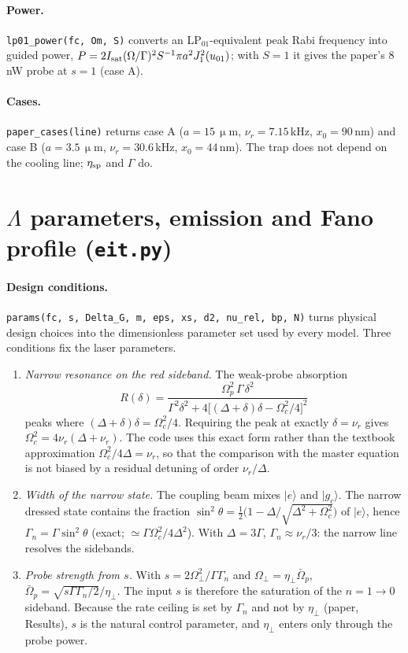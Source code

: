 \documentclass[11pt,a4paper]{article}
\newcommand{\ket}[1]{|#1\rangle}
\newcommand{\gc}{\ket{g_c}}
\newcommand{\Om}{\Omega}
\newcommand{\etap}{\eta_\perp}
\newcommand{\code}[1]{\texttt{#1}}
\newcommand{\um}{\,\upmu\mathrm{m}}
\begin{document}
\paragraph{Power.} \code{lp01\_power(fc, Om, S)} converts an LP$_{01}$-equivalent peak Rabi frequency into guided power, $P=2I_{\rm sat}(\Om/\Gamma)^2S^{-1}\pi a^2J_1^2(u_{01})$; with $S=1$ it gives the paper's 8\,nW probe at $s=1$ (case A).

\paragraph{Cases.} \code{paper\_cases(line)} returns case A ($a=15\um$, $\nu_r=7.15$\,kHz, $x_0=90$\,nm) and case B ($a=3.5\um$, $\nu_r=30.6$\,kHz, $x_0=44$\,nm). The trap does not depend on the cooling line; $\eta_{\rm sp}$ and $\Gamma$ do.

\section{$\Lambda$ parameters, emission and Fano profile (\code{eit.py})}
\label{sec:params}
\paragraph{Design conditions.} \code{params(fc, s, Delta\_G, m, eps, xs, d2, nu\_rel, bp, N)} turns physical design choices into the dimensionless parameter set used by every model. Three conditions fix the laser parameters.
\begin{enumerate}
\item \emph{Narrow resonance on the red sideband.} The weak-probe absorption~\cite{morigi2000,fleischhauer2005}
\begin{equation}
  R(\delta)=\frac{\Om_p^2\,\Gamma\,\delta^2}{\Gamma^2\delta^2+4\big[(\Delta+\delta)\delta-\Om_c^2/4\big]^2}
  \label{eq:fano}
\end{equation}
peaks where $(\Delta+\delta)\delta=\Om_c^2/4$. Requiring the peak at exactly $\delta=\nu_r$ gives $\Om_c^2=4\nu_r(\Delta+\nu_r)$. The code uses this exact form rather than the textbook approximation $\Om_c^2/4\Delta=\nu_r$, so that the comparison with the master equation is not biased by a residual detuning of order $\nu_r/\Delta$.
\item \emph{Width of the narrow state.} The coupling beam mixes $\ket e$ and $\gc$. The narrow dressed state contains the fraction $\sin^2\theta=\tfrac12\big(1-\Delta/\sqrt{\Delta^2+\Om_c^2}\big)$ of $\ket e$, hence $\Gamma_n=\Gamma\sin^2\theta$ (exact; $\simeq\Gamma\Om_c^2/4\Delta^2$). With $\Delta=3\Gamma$, $\Gamma_n\approx\nu_r/3$: the narrow line resolves the sidebands.
\item \emph{Probe strength from $s$.} With $s=2\Om_\perp^2/\Gamma\Gamma_n$ and $\Om_\perp=\etap\bar\Om_p$, $\bar\Om_p=\sqrt{s\Gamma\Gamma_n/2}/\etap$. The input $s$ is therefore the saturation of the $n=1\to0$ sideband. Because the rate ceiling is set by $\Gamma_n$ and not by $\etap$ (paper, Results), $s$ is the natural control parameter, and $\etap$ enters only through the probe power.
\end{enumerate}
\end{document}
